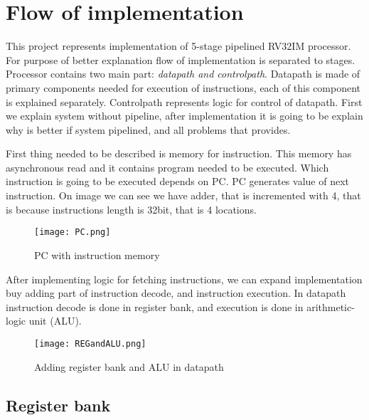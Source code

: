\documentclass{scrreprt}
\begin{document}
\section*{Flow of implementation}

This project represents implementation of 5-stage pipelined RV32IM processor. For purpose of better explanation flow of implementation is separated to stages. Processor contains two main part: \textit{datapath and controlpath}. Datapath is made of primary components needed for execution of instructions, each of this component is explained separately. Controlpath represents logic for control of datapath. First we explain system without pipeline, after implementation it is going to be explain why is better if system pipelined, and all problems that provides. 

First thing needed to be described is memory for instruction. This memory has asynchronous read and it contains program needed to be executed. Which instruction is going to be executed depends on PC. PC generates value of next instruction. On image we can see we have adder, that is incremented with 4, that is because instructions length is 32bit, that is 4 locations. 

\begin{figure}[ht]
    \centering
    \texttt{[image: PC.png]}
    \caption{PC with instruction memory}
    \label{fig:enter-label}
\end{figure}
\hfill \break

After implementing logic for fetching instructions, we can expand implementation buy adding part of instruction decode, and instruction execution. In datapath instruction decode is done in register bank, and execution is done in arithmetic-logic unit (ALU). 

\begin{figure}[htb!]
    \centering
    \texttt{[image: REGandALU.png]}
    \caption{Adding register bank and ALU in datapath}
    \label{fig:regandalu}
\end{figure}
\newpage
\subsection*{Register bank}
\end{document}

